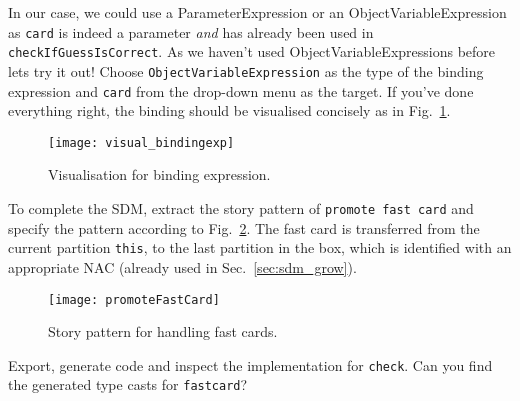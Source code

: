 In our case, we could use a ParameterExpression or an ObjectVariableExpression as \texttt{card} is indeed a parameter \emph{and} has already been used in
\texttt{checkIfGuessIsCorrect}. As we haven't used ObjectVariableExpressions before lets try it out! Choose \texttt{ObjectVariableExpression} as the type of the
binding expression and \texttt{card} from the drop-down menu as the target. If you've done everything right, the binding should be visualised concisely as in
Fig.~\ref{fig:sdm_fastcard_4}.
 
\begin{figure}[htbp]
\begin{center}
  \texttt{[image: visual\_bindingexp]}
  \caption{Visualisation for binding expression.}  
  \label{fig:sdm_fastcard_4}
\end{center}
\end{figure}

To complete the SDM, extract the story pattern of \texttt{promote fast card} and specify the pattern according to Fig.~\ref{fig:sdm_fastcard_5}.
The fast card is transferred from the current partition \texttt{this}, to the last partition in the box, which is identified with an appropriate \mbox{NAC}
(already used in Sec.~\ref{sec:sdm_grow}).

\begin{figure}[htbp]
\begin{center}
  \texttt{[image: promoteFastCard]}
  \caption{Story pattern for handling fast cards.}  
  \label{fig:sdm_fastcard_5}
\end{center}
\end{figure}

Export, generate code and inspect the implementation for \texttt{check}.  Can you find the generated type casts for \texttt{fastcard}?



